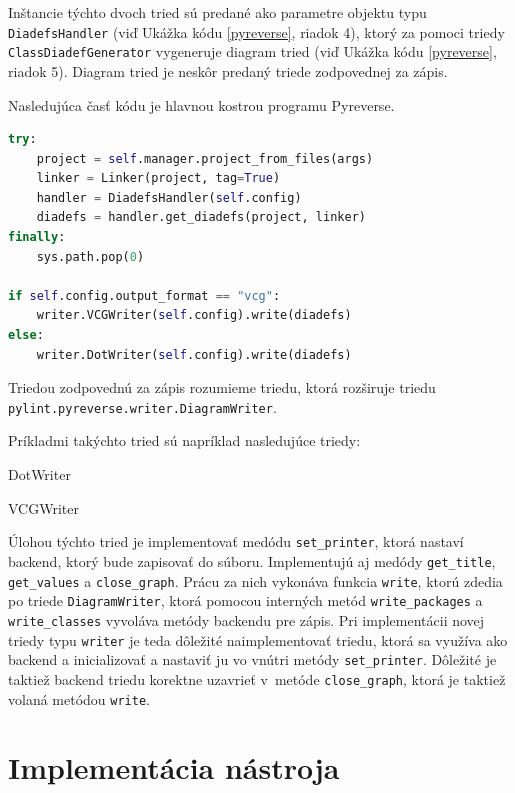 \documentclass[11pt,oneside,final]{fithesis2}
\begin{document}
		Inštancie týchto dvoch tried sú predané ako parametre objektu typu \texttt{DiadefsHandler} (viď Ukážka kódu \ref{pyreverse}, riadok 4), ktorý za pomoci triedy \texttt{ClassDiadefGenerator} vygeneruje diagram tried (viď Ukážka kódu \ref{pyreverse}, riadok 5). Diagram tried je neskôr predaný triede zodpovednej za zápis.
		
		Nasledujúca časť kódu je hlavnou kostrou programu Pyreverse.
		
\begin{lstlisting}[caption=Hlavná časť programu Pyreverse, language=python, label=pyreverse]	
try:
    project = self.manager.project_from_files(args)
    linker = Linker(project, tag=True)
    handler = DiadefsHandler(self.config)
    diadefs = handler.get_diadefs(project, linker)
finally:
    sys.path.pop(0)

if self.config.output_format == "vcg":
	writer.VCGWriter(self.config).write(diadefs)
else:
    writer.DotWriter(self.config).write(diadefs)
\end{lstlisting}
		
		
		Triedou zodpovednú za zápis rozumieme triedu, ktorá rozširuje triedu \texttt{pylint.pyreverse.writer.DiagramWriter}.
		
			Príkladmi takýchto tried sú napríklad nasledujúce triedy:
			    \begin{list}{•}{}
					\item DotWriter
					\item VCGWriter
    			\end{list}
    			
    	Úlohou týchto tried je implementovať medódu \texttt{set\_printer}, ktorá nastaví backend, ktorý bude zapisovať do súboru.
    	Implementujú aj medódy \texttt{get\_title},  \texttt{get\_values} a \texttt{close\_graph}.
    	Prácu za nich vykonáva funkcia \texttt{write}, ktorú zdedia po triede \texttt{DiagramWriter}, ktorá pomocou interných metód \texttt{write\_packages} a \texttt{write\_classes} vyvoláva metódy backendu pre zápis. Pri implementácii novej triedy typu \texttt{writer} je teda dôležité naimplementovať triedu, ktorá sa využíva ako backend a inicializovať a nastaviť ju vo vnútri metódy \texttt{set\_printer}.
    	Dôležité je taktiež backend triedu korektne uzavrieť v~metóde \texttt{close\_graph}, ktorá je taktiež volaná metódou \texttt{write}.
 
\chapter{Implementácia nástroja}
\end{document}

